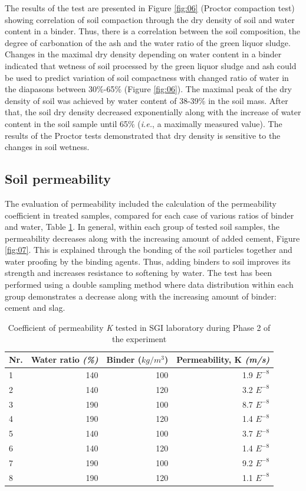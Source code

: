 \documentclass{amestyle}
\begin{document}
The results of the test are presented in Figure \ref{fig:06} (Proctor compaction test) showing correlation of soil compaction through the dry density of soil and water content in a binder. Thus, there is a correlation between the soil composition, the degree of carbonation of the ash and the water ratio of the green liquor sludge. Changes in the maximal dry density depending on water content in a binder indicated that wetness of soil processed by the green liquor sludge and ash could be used to predict variation of soil compactness with changed ratio of water in the diapasons between 30\%-65\% (Figure \ref{fig:06}). The maximal peak of the dry density of soil was achieved by water content of 38-39\% in the soil mass. After that, the soil dry density decreased exponentially along with the increase of water content in the soil sample until 65\% (\emph{i.e.}, a maximally measured value). The results of the Proctor tests demonstrated that dry density is sensitive to the changes in soil wetness.

\subsection{Soil permeability}
 The evaluation of permeability included the calculation of the permeability coefficient in treated samples, compared for each case of various ratios of binder and water, Table \ref{tab:1}. In general, within each group of tested soil samples, the permeability decreases along with the increasing amount of added cement, Figure \ref{fig:07}. This is explained through the bonding of the soil particles together and water proofing by the binding agents. Thus, adding binders to soil improves its strength and increases resistance to softening by water. The test has been performed using a double sampling method where data distribution within each group demonstrates a decrease along with the increasing amount of binder: cement and slag. 

\begin{table}[htbp]
  \caption{Coefficient of permeability \emph{K} tested in SGI laboratory during Phase 2 of the experiment}
  \label{tab:1}
  \centering
  \begin{tabular}{| l | r | r | r |}
    \hline
    \multicolumn{1}{|c|}{Nr.} &
    \multicolumn{1}{|c|}{Water ratio \emph{(\%)}} &
    \multicolumn{1}{|c|}{Binder ($kg/m^3$)} &
    \multicolumn{1}{|c|}{Permeability, K \emph{(m/s)}} \\\hline
    1 & 140 & 100 & 1.9 $E^{-8}$ \\
    2 & 140 & 120 & 3.2 $E^{-8}$ \\
    3 & 190 & 100 & 8.7 $E^{-8}$ \\
    4 & 190 & 120 & 1.4 $E^{-8}$ \\
    5 & 140 & 100 & 3.7 $E^{-8}$ \\
    6 & 140 & 120 & 1.4 $E^{-8}$ \\
    7 & 190 & 100 & 9.2 $E^{-8}$ \\
    8 & 190 & 120 & 1.1 $E^{-8}$ \\\hline
  \end{tabular}
\end{table}
\end{document}
